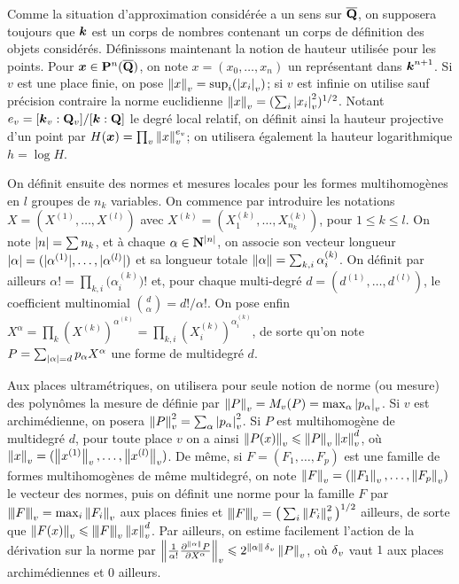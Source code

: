 \documentclass[11pt, twoside, a4paper]{article}
\theoremstyle{remark}
\begin{document}
\pagebreak[3]
Comme la situation d'approximation considérée a un sens sur $\overline{\mathbf{Q}}$, on supposera toujours que $\boldsymbol{k}$ est un corps de nombres contenant un corps de définition des objets considérés. Définissons maintenant la notion de hauteur utilisée pour les points. Pour $\boldsymbol{x} \in \mathbf{P}^n(\overline{\mathbf{Q}})$, on note $x = (x_0, \dots, x_n)$ un représentant dans $\boldsymbol{k}^{n+1}$. Si $v$ est une place finie, on pose $\left\lVert x\right\rVert_{v} = \sup_i(\left\lvert x_i\right\rvert_{v})$; si $v$ est infinie on utilise sauf précision contraire la norme euclidienne $\left\lVert x\right\rVert_{v} = ( \sum_i \left\lvert x_i\right\rvert_{v}^2 )^{1/2}$. Notant $e_v = [\boldsymbol{k}_v : \mathbf{Q}_v]/[\boldsymbol{k} : \mathbf{Q}]$ le degré local relatif, on définit ainsi la hauteur projective d'un point par $H(\boldsymbol{x}) = \prod_v \left\lVert x\right\rVert_{v}^{e_v}$; on utilisera également la hauteur logarithmique $h = \log H$.

On définit ensuite des normes et mesures locales pour les formes multihomogènes en $l$ groupes de $n_k$ variables. On commence par introduire les notations $X = (X^{(1)}, \dots, X^{(l)})$ avec $X^{(k)} = (X^{(k)}_1, \dots, X^{(k)}_{n_k})$, pour $1 \le k \le l$. On note ${\lvert n\rvert} = \sum n_k$, et à chaque $\alpha \in \mathbf{N}^{{\lvert n\rvert}}$, on associe son vecteur longueur ${\lvert\alpha\rvert} = ({\lvert\alpha^{(1)}\rvert}, \dots, {\lvert\alpha^{(l)}\rvert})$ et sa longueur totale $\lVert\alpha\rVert = \sum_{k, i} \alpha^{(k)}_i$. On définit par ailleurs $\alpha ! = \prod_{k, i} \big(\alpha^{(k)}_i\big)!$ et, pour chaque multi-degré $d = (d^{(1)}, \dots, d^{(l)})$, le coefficient multinomial $\binom{d}{\alpha} = d!/\alpha!$. On pose enfin $X^\alpha = \prod_k (X^{(k)})^{\alpha^{(k)}} = \prod_{k, i} (X^{(k)}_i)^{\alpha^{(k)}_i}$, de sorte qu'on note $P = \sum_{{\lvert\alpha\rvert} = d} p_\alpha X^\alpha$ une forme de multidegré $d$.

Aux places ultramétriques, on utilisera pour seule notion de norme (ou mesure) des polynômes la mesure de  définie par $\left\lVert P\right\rVert_{v} = M_{v}(P) = \max_\alpha \left\lvert p_\alpha\right\rvert_{v}$. Si $v$ est archimédienne, on posera $\left\lVert P\right\rVert_{v} ^2 = \sum_\alpha \left\lvert p_\alpha\right\rvert_{v}^2$. Si $P$ est multihomogène de multidegré $d$, pour toute place $v$ on a ainsi $\left\lVert P(x)\right\rVert_{v} \leqslant \left\lVert P\right\rVert_{v} \left\lVert x\right\rVert_{v} ^d$, où $\left\lVert x\right\rVert_{v} = (\left\lVert x^{(1)}\right\rVert_{v}, \dots , \left\lVert x^{(l)}\right\rVert_{v})$. De même, si $F = (F_1, \dots, F_p)$ est une famille de formes multihomogènes de même multidegré, on note $\left\lVert F\right\rVert_{v} = (\left\lVert F_1\right\rVert_{v}, \dots, \left\lVert F_p\right\rVert_{v})$ le vecteur des normes, puis on définit une norme pour la famille $F$ par $\left\lvert\hspace{-1pt}\left\lvert\hspace{-1pt} \left\lvert F\right\rvert \hspace{-1pt}\right\rvert\hspace{-1pt}\right\rvert_{v} = \max_i \left\lVert F_i\right\rVert_{v}$ aux places finies et $\left\lvert\hspace{-1pt}\left\lvert\hspace{-1pt} \left\lvert F\right\rvert \hspace{-1pt}\right\rvert\hspace{-1pt}\right\rvert_{v} = \big(\sum_i \left\lVert F_i\right\rVert_{v}^2 \big)^{1/2}$ ailleurs, de sorte que $\left\lVert F(x)\right\rVert_{v} \leqslant \left\lvert\hspace{-1pt}\left\lvert\hspace{-1pt} \left\lvert F\right\rvert \hspace{-1pt}\right\rvert\hspace{-1pt}\right\rvert_{v} \left\lVert x\right\rVert_{v}^d$. Par ailleurs, on estime facilement l'action de la dérivation sur la norme par $\left\lVert\frac1 {\alpha !} \frac{\partial^{\lVert\alpha\rVert}P}{\partial X^\alpha}\right\rVert_{v} \leqslant 2^{\lVert\alpha\rVert \, {\delta\smash{_v}}} \left\lVert P\right\rVert_{v}$, où ${\delta\smash{_v}}$ vaut $1$ aux places archimédiennes et $0$ ailleurs.
\end{document}
